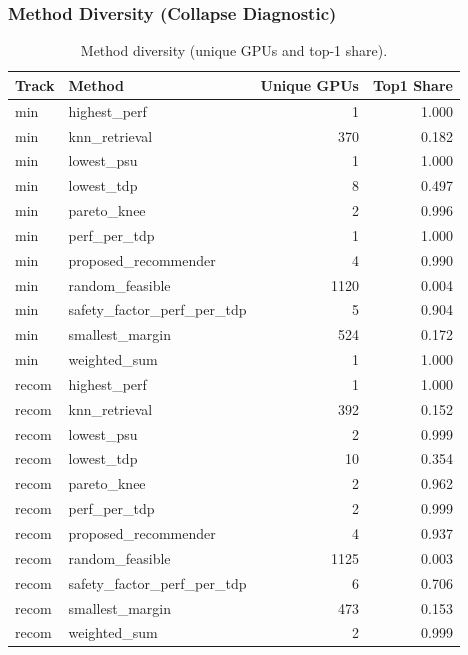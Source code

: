 \subsubsection{Method Diversity (Collapse Diagnostic)}
\begin{table}[t]
\centering
\small
\caption{Method diversity (unique GPUs and top-1 share).}
\label{tab:diversity}
\begin{tabular}{llrr}
\hline
Track & Method & Unique GPUs & Top1 Share \\
\hline
min & highest\_perf & 1 & 1.000 \\
min & knn\_retrieval & 370 & 0.182 \\
min & lowest\_psu & 1 & 1.000 \\
min & lowest\_tdp & 8 & 0.497 \\
min & pareto\_knee & 2 & 0.996 \\
min & perf\_per\_tdp & 1 & 1.000 \\
min & proposed\_recommender & 4 & 0.990 \\
min & random\_feasible & 1120 & 0.004 \\
min & safety\_factor\_perf\_per\_tdp & 5 & 0.904 \\
min & smallest\_margin & 524 & 0.172 \\
min & weighted\_sum & 1 & 1.000 \\
recom & highest\_perf & 1 & 1.000 \\
recom & knn\_retrieval & 392 & 0.152 \\
recom & lowest\_psu & 2 & 0.999 \\
recom & lowest\_tdp & 10 & 0.354 \\
recom & pareto\_knee & 2 & 0.962 \\
recom & perf\_per\_tdp & 2 & 0.999 \\
recom & proposed\_recommender & 4 & 0.937 \\
recom & random\_feasible & 1125 & 0.003 \\
recom & safety\_factor\_perf\_per\_tdp & 6 & 0.706 \\
recom & smallest\_margin & 473 & 0.153 \\
recom & weighted\_sum & 2 & 0.999 \\
\hline
\end{tabular}
\end{table}

